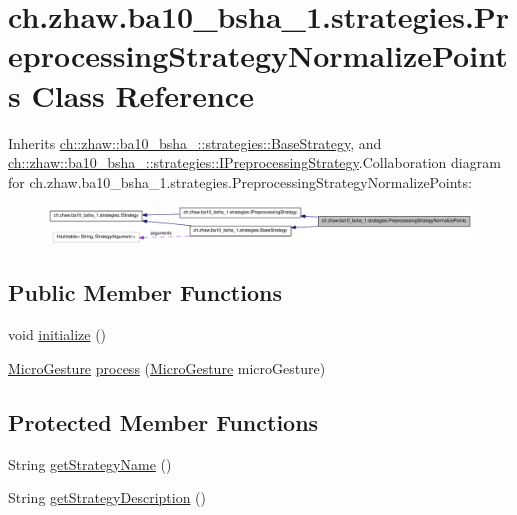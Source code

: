 \hypertarget{classch_1_1zhaw_1_1ba10__bsha__1_1_1strategies_1_1PreprocessingStrategyNormalizePoints}{
\section{ch.zhaw.ba10\_\-bsha\_\-1.strategies.PreprocessingStrategyNormalizePoints Class Reference}
\label{classch_1_1zhaw_1_1ba10__bsha__1_1_1strategies_1_1PreprocessingStrategyNormalizePoints}
}


Inherits \hyperlink{classch_1_1zhaw_1_1ba10__bsha__1_1_1strategies_1_1BaseStrategy}{ch::zhaw::ba10\_\-bsha\_::strategies::BaseStrategy}, and \hyperlink{interfacech_1_1zhaw_1_1ba10__bsha__1_1_1strategies_1_1IPreprocessingStrategy}{ch::zhaw::ba10\_\-bsha\_::strategies::IPreprocessingStrategy}.Collaboration diagram for ch.zhaw.ba10\_\-bsha\_\-1.strategies.PreprocessingStrategyNormalizePoints:\nopagebreak
\begin{figure}[H]
\begin{center}
\leavevmode
\includegraphics[width=400pt]{classch_1_1zhaw_1_1ba10__bsha__1_1_1strategies_1_1PreprocessingStrategyNormalizePoints__coll__graph}
\end{center}
\end{figure}
\subsection*{Public Member Functions}
\begin{DoxyCompactItemize}
\item 
void \hyperlink{classch_1_1zhaw_1_1ba10__bsha__1_1_1strategies_1_1PreprocessingStrategyNormalizePoints_a933e6d434685d7273ddf132419f8738b}{initialize} ()
\item 
\hyperlink{classch_1_1zhaw_1_1ba10__bsha__1_1_1service_1_1MicroGesture}{MicroGesture} \hyperlink{classch_1_1zhaw_1_1ba10__bsha__1_1_1strategies_1_1PreprocessingStrategyNormalizePoints_a0b7ffa8b9a2f6d98a2b871fc4afa39f9}{process} (\hyperlink{classch_1_1zhaw_1_1ba10__bsha__1_1_1service_1_1MicroGesture}{MicroGesture} microGesture)
\end{DoxyCompactItemize}
\subsection*{Protected Member Functions}
\begin{DoxyCompactItemize}
\item 
String \hyperlink{classch_1_1zhaw_1_1ba10__bsha__1_1_1strategies_1_1PreprocessingStrategyNormalizePoints_ac9826f8ef875b62955887e6f3ffe7cff}{getStrategyName} ()
\item 
String \hyperlink{classch_1_1zhaw_1_1ba10__bsha__1_1_1strategies_1_1PreprocessingStrategyNormalizePoints_a9b2a647c2f4d9702d943dbe8ef43485e}{getStrategyDescription} ()
\end{DoxyCompactItemize}
